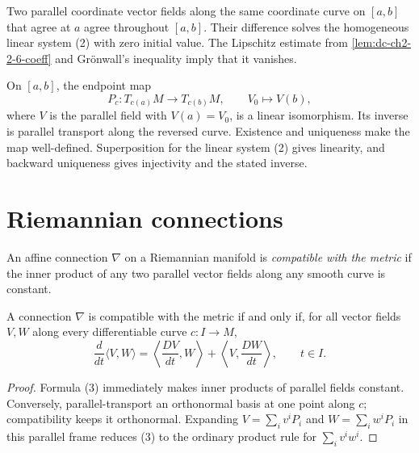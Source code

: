 \begin{lemma}
  \label{lem:dc-ch2-2-6-unique}
  \leanok
  Two parallel coordinate vector fields along the same coordinate curve on
  $[a,b]$ that agree at $a$ agree throughout $[a,b]$.
  \sketch
  Their difference solves the homogeneous linear system (2) with zero initial
  value. The Lipschitz estimate from \cref{lem:dc-ch2-2-6-coeff} and
  Grönwall's inequality imply that it vanishes.
\end{lemma}

\begin{lemma}
  \label{lem:dc-ch2-2-6-transport}
  \leanok
  On $[a,b]$, the endpoint map
  \[
    P_c\colon T_{c(a)}M\longrightarrow T_{c(b)}M,
    \qquad V_0\longmapsto V(b),
  \]
  where $V$ is the parallel field with $V(a)=V_0$, is a linear isomorphism.
  Its inverse is parallel transport along the reversed curve.
  \sketch
  Existence and uniqueness make the map well-defined. Superposition for the
  linear system (2) gives linearity, and backward uniqueness gives injectivity
  and the stated inverse.
\end{lemma}

\section{Riemannian connections}

\begin{definition}
  \label{def:dc-ch2-3-1}
  \leanok
  An affine connection $\nabla$ on a Riemannian manifold is \emph{compatible
  with the metric} if the inner product of any two parallel vector fields along
  any smooth curve is constant.
\end{definition}

\begin{proposition}
  \label{prop:dc-ch2-3-2}
  \leanok
  A connection $\nabla$ is compatible with the metric if and only if, for all
  vector fields $V,W$ along every differentiable curve $c\colon I\to M$,
  \[
    \frac{d}{dt}\langle V,W\rangle
      =\left\langle\frac{DV}{dt},W\right\rangle
       +\left\langle V,\frac{DW}{dt}\right\rangle,
    \qquad t\in I.\tag{3}
  \]
\end{proposition}
\begin{proof}
  \leanok
  \sketch
  Formula (3) immediately makes inner products of parallel fields constant.
  Conversely, parallel-transport an orthonormal basis at one point along $c$;
  compatibility keeps it orthonormal. Expanding
  $V=\sum_iv^iP_i$ and $W=\sum_iw^iP_i$ in this parallel frame reduces (3) to
  the ordinary product rule for $\sum_iv^iw^i$.
\end{proof}

